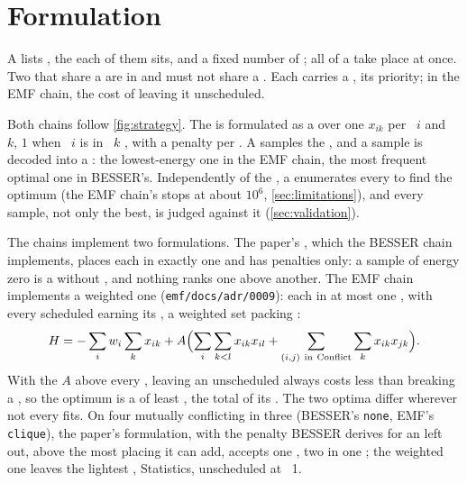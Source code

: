 \section{Formulation}\label{app:formulation}

A  lists , the  each of them sits, and a fixed number of ; all  of a 
take place at once. Two  that share a  are in  and must not share a 
\cite[§5.2, Algorithm 1]{Paper}. Each  carries a , its priority; in the EMF chain, the cost of
leaving it unscheduled.

Both chains follow \cref{fig:strategy}. The  is formulated as a  over one 
$x_{ik}$ per ~$i$ and ~$k$, $1$ when ~$i$ is in ~$k$ \cite[§5.3, Eq. (4)]{Paper}, with a
penalty per . A  samples the , and a sample is decoded into a : the
lowest-energy one in the EMF chain, the most frequent optimal one in BESSER's. Independently of the , a
 enumerates every  to find the optimum (the EMF chain's stops at about $10^6$,
\cref{sec:limitations}), and
every sample, not only the best, is judged against it (\cref{sec:validation}).

The chains implement two formulations. The paper's \cite[§5.3, Eqs. (5)--(10)]{Paper}, which the BESSER
chain implements, places each  in exactly one  and has penalties only: a sample of energy zero is a
 without , and nothing ranks one  above another. The EMF chain implements a weighted
one (\texttt{emf/docs/adr/0009}): each  in at most one  \cite[§4.2, Eq. (30)]{Lucas}, with every
scheduled  earning its , a weighted set packing \cite[§4.2]{Glover}:
\[
	H = -\sum_i w_i \sum_k x_{ik}
	+ A \Bigl( \sum_i \sum_{k<l} x_{ik} x_{il} + \sum_{(i,j)\ \mathrm{in\ Conflict}} \sum_k x_{ik} x_{jk} \Bigr).
\]
With the  $A$ above every , leaving an  unscheduled always costs less than
breaking a  \cite[§4.2]{Lucas}, so the optimum is a   of least , the total
 of its . The two optima differ wherever not every  fits. On four mutually
conflicting  in three  (BESSER's \texttt{none}, EMF's \texttt{clique}), the paper's
formulation, with the penalty BESSER derives for an  left out, above the most  placing it can add, accepts one
, two  in one ; the weighted one leaves the lightest , Statistics, unscheduled at ~1.

